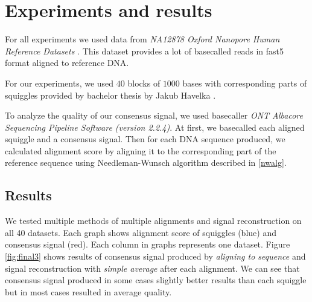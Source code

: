 \chapter{Experiments and results}

\label{kap:experiments} %

For all experiments we used data from \textit{NA12878 Oxford Nanopore Human Reference Datasets} \cite{data}. 
This dataset provides a lot of basecalled reads in fast5 format aligned to reference DNA. 

For our experiments, we used $40$ blocks of $1000$ bases with corresponding parts of squiggles provided by 
bachelor thesis by Jakub Havelka \cite{kubo}.

To analyze the quality of our consensus signal, we used basecaller \textit{ONT Albacore Sequencing Pipeline Software (version 2.2.4)}.
At first, we basecalled each aligned squiggle and a consensus signal. 
Then for each DNA sequence produced, we calculated alignment
score by aligning it to the corresponding part of the reference sequence 
using Needleman-Wunsch algorithm described in \ref{nwalg}.

\section{Results}
We tested multiple methods of multiple alignments and signal reconstruction on all 40 datasets.
Each graph shows alignment score of squiggles (blue) and consensus signal (red).
Each column in graphs represents one dataset.
Figure \ref{fig:final3} shows results of consensus signal produced by \textit{aligning to sequence} and 
signal reconstruction with \textit{simple average} after each alignment. We can see that consensus signal produced in some cases slightly better results than each squiggle but in most cases resulted in average quality.

